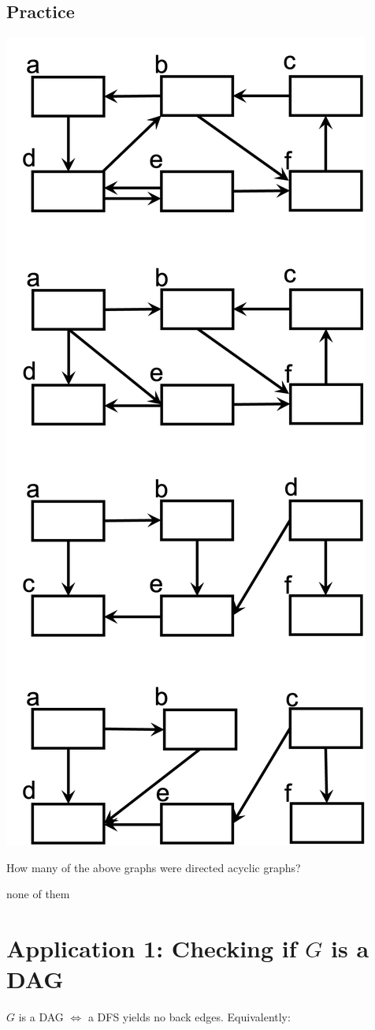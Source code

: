 \documentclass[11  pt]{exam}
\begin{document}
	\newpage
	\subsection{Practice}
	\includegraphics[width = .6\linewidth]{manydfs.png}
	\newpage
	\begin{Qu}
		How many of the above graphs were directed acyclic graphs?
		\begin{itemize}
			\eitem none of them
		\end{itemize}
	\end{Qu}

\newpage

	\section{Application 1: Checking if $G$ is a DAG}
	
	\begin{theorem}
		$G$ is a DAG $\iff$ a DFS yields no back edges. Equivalently:
		\begin{center}
		\end{center}
	\end{theorem}
	
\end{document}
